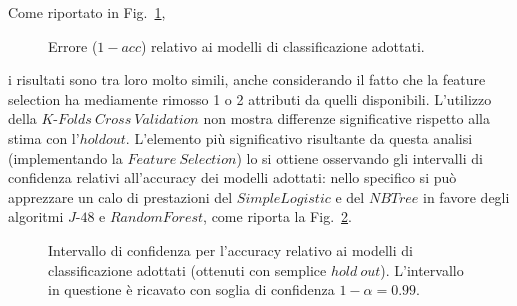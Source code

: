 \documentclass[fleqn,10pt]{SelfArx} %
\begin{document}
Come riportato in Fig.~\ref{holdout_acc_leg:fig},
\begin{figure}
\caption{\label{holdout_acc_leg:fig} Errore ($1-acc$) relativo ai modelli di classificazione adottati.}
\end{figure}
i risultati sono tra loro molto simili, anche considerando il fatto che la feature selection ha mediamente rimosso 1 o 2 attributi da quelli disponibili. 
L'utilizzo della $K$-$Folds\ Cross\ Validation$ non  mostra differenze significative rispetto alla stima con l’$holdout$. 
L'elemento più significativo risultante da questa analisi (implementando la $Feature\ Selection$) lo si ottiene osservando gli intervalli di confidenza relativi all'accuracy dei modelli adottati: nello specifico si può apprezzare un  calo di prestazioni del $SimpleLogistic$ e del $NBTree$ in favore degli algoritmi $J$-$48$
e $RandomForest$, come riporta la Fig.~\ref{acc_leg:fig}. 
\begin{figure}
\caption{\label{acc_leg:fig} Intervallo di confidenza per l'accuracy relativo ai modelli di classificazione adottati (ottenuti con semplice $hold\ out$). L'intervallo in questione è ricavato con soglia di confidenza $1-\alpha=0.99$.}
\end{figure}
\end{document}

